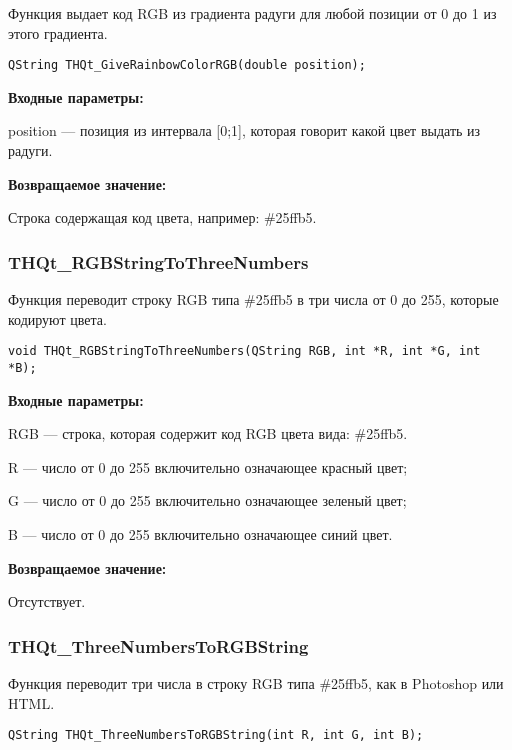\documentclass[a4paper,12pt]{article}
\begin{document}
Функция выдает код RGB из градиента радуги для любой позиции от 0 до 1 из этого градиента.


\begin{lstlisting}[label=code_syntax_THQt_GiveRainbowColorRGB,caption=Синтаксис]
QString THQt_GiveRainbowColorRGB(double position);
\end{lstlisting}

\textbf{Входные параметры:}

position --- позиция из интервала [0;1], которая говорит какой цвет выдать из радуги.

\textbf{Возвращаемое значение:}

Строка содержащая код цвета, например: \#25ffb5.


\subsubsection{THQt\_RGBStringToThreeNumbers}\label{THQt_RGBStringToThreeNumbers}

Функция переводит строку RGB типа \#25ffb5 в три числа от 0 до 255, которые кодируют  цвета.


\begin{lstlisting}[label=code_syntax_THQt_RGBStringToThreeNumbers,caption=Синтаксис]
void THQt_RGBStringToThreeNumbers(QString RGB, int *R, int *G, int *B);
\end{lstlisting}

\textbf{Входные параметры:}

RGB --- строка, которая содержит код RGB цвета вида: \#25ffb5.
 
    R --- число от 0 до 255 включительно означающее красный цвет;
 
    G --- число от 0 до 255 включительно означающее зеленый цвет;
 
    B --- число от 0 до 255 включительно означающее синий цвет.

\textbf{Возвращаемое значение:}

Отсутствует.


\subsubsection{THQt\_ThreeNumbersToRGBString}\label{THQt_ThreeNumbersToRGBString}

Функция переводит три числа в строку RGB типа \#25ffb5, как в Photoshop или HTML.


\begin{lstlisting}[label=code_syntax_THQt_ThreeNumbersToRGBString,caption=Синтаксис]
QString THQt_ThreeNumbersToRGBString(int R, int G, int B);
\end{lstlisting}
\end{document}
